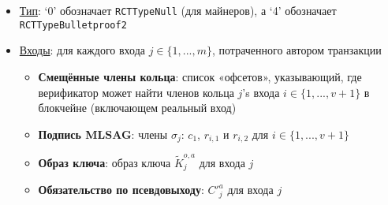 \begin{itemize}
    \item \underline{Тип}: `0' обозначает {\tt RCTTypeNull} (для майнеров), а `4' обозначает {\tt RCTTypeBulletproof2} %
    \item \underline{Входы}: для каждого входа $j \in \{1,...,m\}$, потраченного автором транзакции 
    \begin{itemize}
        \item \textbf{Смещённые члены кольца}: список «офсетов», указывающий, где верификатор может найти членов кольца $j$'s входа $i \in \{1,...,v+1\}$ в блокчейне (включающем реальный вход)
        \item \textbf{Подпись MLSAG}: члены $\sigma_j$: $c_1$, $r_{i,1}$ и $r_{i,2}$ для $i \in \{1,...,v+1\}$
        \item \textbf{Образ ключа}: образ ключа $\tilde{K}^{o,a}_j$ для входа $j$
        \item \textbf{Обязательство по псевдовыходу}: $C'^{a}_j$ для входа $j$
    \end{itemize}
    

\end{itemize}

